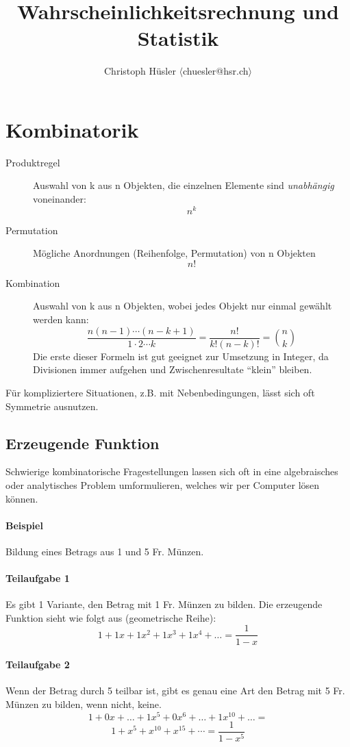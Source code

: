 \documentclass[10pt,a4paper]{scrartcl}
\title{Wahrscheinlichkeitsrechnung und Statistik}
\author{Christoph H\"usler $\langle$chuesler@hsr.ch$\rangle$ }
\begin{document}
\maketitle
\section{Kombinatorik}
\begin{description}
\item[Produktregel] Auswahl von k aus n Objekten, die einzelnen Elemente sind \emph{unabhängig} voneinander: $$n^k$$
\item[Permutation] Mögliche Anordnungen (Reihenfolge, Permutation) von n Objekten $$n!$$
\item[Kombination] Auswahl von k aus n Objekten, wobei jedes Objekt nur einmal gewählt werden kann:
    $$\frac{n(n-1)\cdots(n-k+1)}{1 \cdot 2 \cdots k} = \frac{n!}{k!(n-k)!} = {n \choose k}$$
    Die erste dieser Formeln ist gut geeignet zur Umsetzung in Integer, da Divisionen immer aufgehen und Zwischenresultate ``klein'' bleiben.
\end{description}

Für kompliziertere Situationen, z.B. mit Nebenbedingungen, lässt sich oft Symmetrie ausnutzen.

\subsection{Erzeugende Funktion}
Schwierige kombinatorische Fragestellungen lassen sich oft in eine algebraisches oder analytisches Problem umformulieren, welches wir per Computer lösen können.

\paragraph{Beispiel} Bildung eines Betrags aus 1 und 5 Fr. Münzen.
\paragraph{Teilaufgabe 1} Es gibt 1 Variante, den Betrag mit 1 Fr. Münzen zu bilden.
Die erzeugende Funktion sieht wie folgt aus (geometrische Reihe): $$1 + 1x + 1x^2 + 1x^3 + 1x^4 + \dots = \frac{1}{1-x}$$ 

\paragraph{Teilaufgabe 2} Wenn der Betrag durch 5 teilbar ist, gibt es genau eine Art den Betrag mit 5 Fr. Münzen zu bilden, wenn nicht, keine.
$$1 + 0x + \dots + 1x^5 + 0x^6 + \dots + 1x^{10} + \dots = $$ $$1 + x^5 + x^{10} + x^{15} + \cdots = \frac{1}{1-x^5}$$
\end{document}
